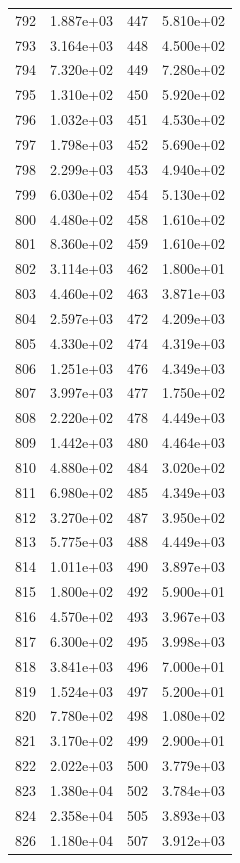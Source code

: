\documentclass[12pt]{article}
\begin{document}
\begin{longtable}{@{}cccc@{}}
792 & 1.887e+03 & 447 & 5.810e+02 \\
793 & 3.164e+03 & 448 & 4.500e+02 \\
794 & 7.320e+02 & 449 & 7.280e+02 \\
795 & 1.310e+02 & 450 & 5.920e+02 \\
796 & 1.032e+03 & 451 & 4.530e+02 \\
797 & 1.798e+03 & 452 & 5.690e+02 \\
798 & 2.299e+03 & 453 & 4.940e+02 \\
799 & 6.030e+02 & 454 & 5.130e+02 \\
800 & 4.480e+02 & 458 & 1.610e+02 \\
801 & 8.360e+02 & 459 & 1.610e+02 \\
802 & 3.114e+03 & 462 & 1.800e+01 \\
803 & 4.460e+02 & 463 & 3.871e+03 \\
804 & 2.597e+03 & 472 & 4.209e+03 \\
805 & 4.330e+02 & 474 & 4.319e+03 \\
806 & 1.251e+03 & 476 & 4.349e+03 \\
807 & 3.997e+03 & 477 & 1.750e+02 \\
808 & 2.220e+02 & 478 & 4.449e+03 \\
809 & 1.442e+03 & 480 & 4.464e+03 \\
810 & 4.880e+02 & 484 & 3.020e+02 \\
811 & 6.980e+02 & 485 & 4.349e+03 \\
812 & 3.270e+02 & 487 & 3.950e+02 \\
813 & 5.775e+03 & 488 & 4.449e+03 \\
814 & 1.011e+03 & 490 & 3.897e+03 \\
815 & 1.800e+02 & 492 & 5.900e+01 \\
816 & 4.570e+02 & 493 & 3.967e+03 \\
817 & 6.300e+02 & 495 & 3.998e+03 \\
818 & 3.841e+03 & 496 & 7.000e+01 \\
819 & 1.524e+03 & 497 & 5.200e+01 \\
820 & 7.780e+02 & 498 & 1.080e+02 \\
821 & 3.170e+02 & 499 & 2.900e+01 \\
822 & 2.022e+03 & 500 & 3.779e+03 \\
823 & 1.380e+04 & 502 & 3.784e+03 \\
824 & 2.358e+04 & 505 & 3.893e+03 \\
826 & 1.180e+04 & 507 & 3.912e+03 \\

\end{longtable}
\end{document}
